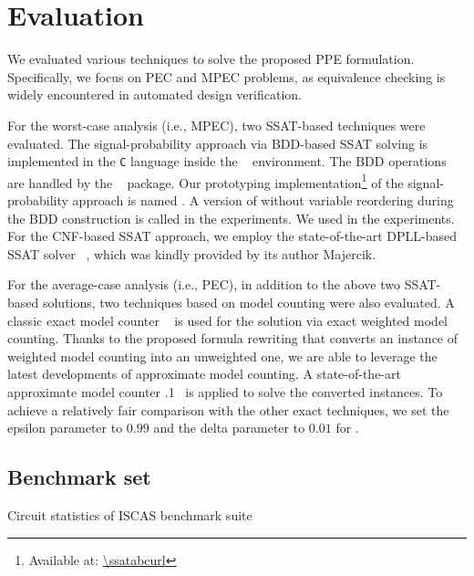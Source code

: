 \section{Evaluation}
\label{sect:prob-evaluation}

We evaluated various techniques to solve the proposed PPE formulation.
Specifically, we focus on PEC and MPEC problems,
as equivalence checking is widely encountered in automated design verification.

For the worst-case analysis (i.e., MPEC), two SSAT-based techniques were evaluated.
The signal-probability approach via BDD-based SSAT solving
is implemented in the \texttt{C} language inside the \abc~\cite{ABC} environment.
The BDD operations are handled by the \cudd~\cite{CUDD} package.
Our prototyping implementation\footnote{Available at: \url{\ssatabcurl}}
of the signal-probability approach is named \bddsp.
A version of \bddsp without variable reordering during the BDD construction
is called \bddspnr in the experiments.
We used \ssatABCRevision in the experiments.
For the CNF-based SSAT approach,
we employ the state-of-the-art DPLL-based SSAT solver \dcssat~\cite{Majercik2005},
which was kindly provided by its author Majercik.

For the average-case analysis (i.e., PEC),
in addition to the above two SSAT-based solutions,
two techniques based on model counting were also evaluated.
A classic exact model counter \cachet~\cite{Sang2004,Sang2005ModelCounting} is used
for the solution via exact weighted model counting.
Thanks to the proposed formula rewriting
that converts an instance of weighted model counting into an unweighted one,
we are able to leverage the latest developments of approximate model counting.
A state-of-the-art approximate model counter .1~\cite{Chakraborty2013,Chakraborty2016}
is applied to solve the converted instances.
To achieve a relatively fair comparison with the other exact techniques,
we set the epsilon parameter to $0.99$ and the delta parameter to $0.01$ for \approxmc.

\subsection{Benchmark set}
\begin{table}[ht]
    \centering
    \scriptsize
    \caption{Circuit statistics of ISCAS benchmark suite}
    \label{tbl:prob-design-eval-iscas}
\end{table}

